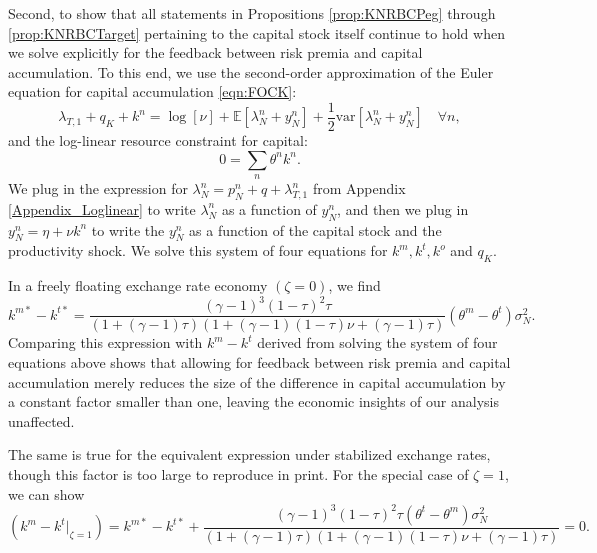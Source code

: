 Second, to show that all statements in Propositions
\ref{prop:KNRBCPeg} through \ref{prop:KNRBCTarget} pertaining to the
capital stock itself continue to hold when we solve explicitly for the
feedback between risk premia and capital accumulation. To this end, we
use the second-order approximation of the Euler equation for capital
accumulation \eqref{eqn:FOCK}:
\begin{equation*}
  \lambda_{T, 1}  + q_K + k^n
  = \log[\nu] + \mathbb{E}\left[ \lambda_N^n + y_N^n \right]
  + \frac{1}{2} \text{var}\left[ \lambda_N^n + y_N^n \right] \quad \forall n,
\end{equation*}
and the log-linear resource constraint for capital:
\begin{equation*}
  0 = \sum_n \theta^n k^n.
\end{equation*}
We plug in the expression for
$\lambda_N^n = p^n_N + q + \lambda^n_{T, 1}$ from Appendix
\ref{Appendix_Loglinear} to write $\lambda_N^n$ as a function of
$y_N^n$, and then we plug in $y_N^n = \eta + \nu k^n$ to write the
$y_N^n$ as a function of the capital stock and the productivity shock.
We solve this system of four equations for $k^m, k^t, k^o$ and $q_K$.

In a freely floating exchange rate economy $(\zeta = 0)$, we find
\begin{equation*}
  k^{m \ast} - k^{t \ast} = 
  \frac{(\gamma - 1)^3 (1 - \tau)^2 \tau}{\left( 1 + (\gamma - 1) \tau \right) \left( 1 + (\gamma - 1) (1 - \tau) \nu + (\gamma - 1) \tau \right)} 
  \left( \theta^m - \theta^t \right) \sigma_N^2. 
\end{equation*}
Comparing this expression with $k^m - k^t$ derived from solving the
system of four equations above shows that allowing for feedback
between risk premia and capital accumulation merely reduces the size
of the difference in capital accumulation by a constant factor smaller
than one, leaving the economic insights of our analysis unaffected.

The same is true for the equivalent expression under stabilized
exchange rates, though this factor is too large to reproduce in print.
For the special case of \(\zeta=1\), we can show
\begin{equation*}
  \left( k^m - k^t \vert_{\zeta = 1} \right) = k^{m \ast} - k^{t \ast} + 
  \frac{(\gamma - 1)^3 (1 - \tau)^2 \tau \left( \theta^t - \theta^m \right) \sigma_N^2}{\left( 1 + (\gamma - 1) \tau \right) \left( 1 + (\gamma - 1) (1 - \tau) \nu + (\gamma - 1) \tau \right)} 
  = 0.
\end{equation*}



